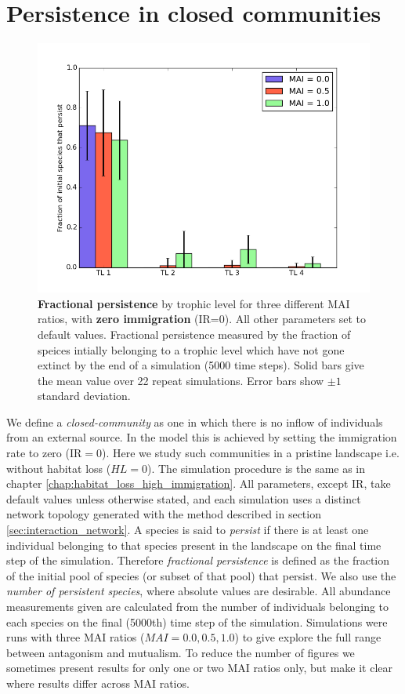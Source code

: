 \section{Persistence in closed communities}
\label{sec:closed_communities}

\begin{figure}
	\centering
	\includegraphics[width=0.8\linewidth]{"figures/persistence/hist_species_per_tl_zeroIR"}
	\caption{\textbf{Fractional persistence} by trophic level for three different MAI ratios, with \textbf{zero immigration} (IR=0). All other parameters set to default values. Fractional persistence measured by the fraction of speices intially belonging to a trophic level which have not gone extinct by the end of a simulation (5000 time steps). Solid bars give the mean value over 22 repeat simulations. Error bars show $\pm 1$ standard deviation.}
	\label{fig:mvp_hist_zeroIR}
\end{figure}

We define a \emph{closed-community} as one in which there is no inflow of individuals from an external source. In the model this is achieved by setting the immigration rate to zero (IR$=0$). Here we study such communities in a pristine landscape i.e. without habitat loss ($HL=0$). The simulation procedure is the same as in chapter \ref{chap:habitat_loss_high_immigration}. All parameters, except IR, take default values unless otherwise stated, and each simulation uses a distinct network topology generated with the method described in section \ref{sec:interaction_network}. A species is said to \emph{persist} if there is at least one individual belonging to that species present in the landscape on the final time step of the simulation. Therefore \emph{fractional persistence} is defined as the fraction of the initial pool of species (or subset of that pool) that persist. We also use the \emph{number of persistent species}, where absolute values are desirable. All abundance measurements given are calculated from the number of individuals belonging to each species on the final (5000th) time step of the simulation.
Simulations were runs with three MAI ratios ($MAI=0.0,0.5,1.0$) to give explore the full range between antagonism and mutualism. To reduce the number of figures we sometimes present results for only one or two MAI ratios only, but make it clear where results differ across MAI ratios.

